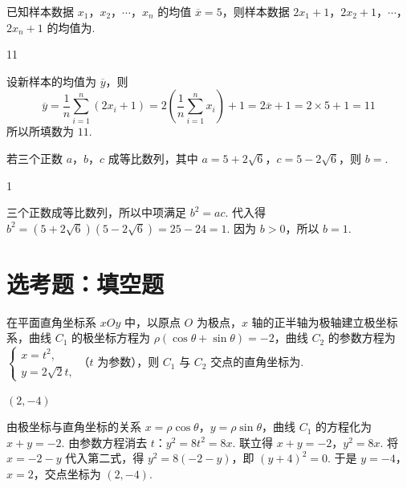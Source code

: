 \begin{problem}
已知样本数据 \(x_{1}\)，\(x_{2}\)，\(\cdots\)，\(x_{n}\) 的均值 \(\overline{x} = 5\)，则样本数据 \(2x_{1} + 1\)，\(2x_{2} + 1\)，\(\cdots\)，\(2x_{n} + 1\) 的均值为\fillinblank{}.
\end{problem}

\begin{answer}
11
\end{answer}

\begin{solution}
设新样本的均值为 \(\overline{y}\)，则
\[
\overline{y}=\frac{1}{n}\sum_{i=1}^{n}(2x_i+1)=2\left(\frac{1}{n}\sum_{i=1}^{n}x_i\right)+1=2\overline{x}+1=2\times5+1=11
\]
所以所填数为 \(11\).
\end{solution}

\begin{problem}
若三个正数 \(a\)，\(b\)，\(c\) 成等比数列，其中 \(a = 5 + 2\sqrt{6}\)，\(c = 5 - 2\sqrt{6}\)，则 \(b =\)\fillinblank{}.
\end{problem}

\begin{answer}
1
\end{answer}

\begin{solution}
三个正数成等比数列，所以中项满足 \(b^2=ac\). 代入得 \(b^2=(5+2\sqrt6)(5-2\sqrt6)=25-24=1\). 因为 \(b>0\)，所以 \(b=1\).
\end{solution}

\section{选考题：填空题}

\begin{problem}
在平面直角坐标系 \(xOy\) 中，以原点 \(O\) 为极点，\(x\) 轴的正半轴为极轴建立极坐标系，曲线 \(C_1\) 的极坐标方程为 \(\rho (\cos \theta + \sin \theta) = -2\)，曲线 \(C_2\) 的参数方程为 \(\begin{cases}
x = t^2,\\
y = 2\sqrt{2}t,
\end{cases}\)（\(t\) 为参数），则 \(C_1\) 与 \(C_2\) 交点的直角坐标为\fillinblank{}.
\end{problem}

\begin{answer}
\(\left(2,-4\right)\)
\end{answer}

\begin{solution}
由极坐标与直角坐标的关系 \(x=\rho\cos\theta\)，\(y=\rho\sin\theta\)，曲线 \(C_1\) 的方程化为 \(x+y=-2\). 由参数方程消去 \(t\)：\(y^2=8t^2=8x\). 联立得
\(x+y=-2\)，\(y^2=8x\).
将 \(x=-2-y\) 代入第二式，得 \(y^2=8(-2-y)\)，即 \((y+4)^2=0\). 于是 \(y=-4\)，\(x=2\)，交点坐标为 \(\left(2,-4\right)\).
\end{solution}


